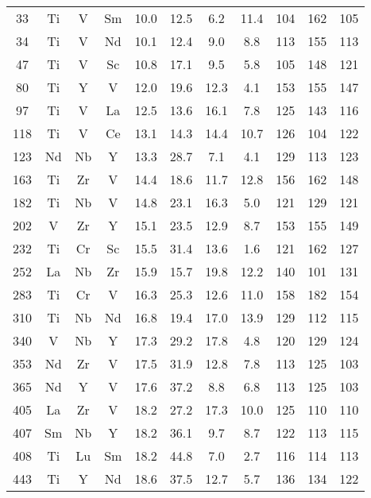 \begin{center}
\begin{xtabular}{c|ccc|cccc|ccc}
  33 &   Ti &    V &   Sm & 10.0 & 12.5 &  6.2 & 11.4 &  104 &  162 &  105 \\
  34 &   Ti &    V &   Nd & 10.1 & 12.4 &  9.0 &  8.8 &  113 &  155 &  113 \\
  47 &   Ti &    V &   Sc & 10.8 & 17.1 &  9.5 &  5.8 &  105 &  148 &  121 \\
  80 &   Ti &    Y &    V & 12.0 & 19.6 & 12.3 &  4.1 &  153 &  155 &  147 \\
  97 &   Ti &    V &   La & 12.5 & 13.6 & 16.1 &  7.8 &  125 &  143 &  116 \\
 118 &   Ti &    V &   Ce & 13.1 & 14.3 & 14.4 & 10.7 &  126 &  104 &  122 \\
 123 &   Nd &   Nb &    Y & 13.3 & 28.7 &  7.1 &  4.1 &  129 &  113 &  123 \\
 163 &   Ti &   Zr &    V & 14.4 & 18.6 & 11.7 & 12.8 &  156 &  162 &  148 \\
 182 &   Ti &   Nb &    V & 14.8 & 23.1 & 16.3 &  5.0 &  121 &  129 &  121 \\
 202 &    V &   Zr &    Y & 15.1 & 23.5 & 12.9 &  8.7 &  153 &  155 &  149 \\
 232 &   Ti &   Cr &   Sc & 15.5 & 31.4 & 13.6 &  1.6 &  121 &  162 &  127 \\
 252 &   La &   Nb &   Zr & 15.9 & 15.7 & 19.8 & 12.2 &  140 &  101 &  131 \\
 283 &   Ti &   Cr &    V & 16.3 & 25.3 & 12.6 & 11.0 &  158 &  182 &  154 \\
 310 &   Ti &   Nb &   Nd & 16.8 & 19.4 & 17.0 & 13.9 &  129 &  112 &  115 \\
 340 &    V &   Nb &    Y & 17.3 & 29.2 & 17.8 &  4.8 &  120 &  129 &  124 \\
 353 &   Nd &   Zr &    V & 17.5 & 31.9 & 12.8 &  7.8 &  113 &  125 &  103 \\
 365 &   Nd &    Y &    V & 17.6 & 37.2 &  8.8 &  6.8 &  113 &  125 &  103 \\
 405 &   La &   Zr &    V & 18.2 & 27.2 & 17.3 & 10.0 &  125 &  110 &  110 \\
 407 &   Sm &   Nb &    Y & 18.2 & 36.1 &  9.7 &  8.7 &  122 &  113 &  115 \\
 408 &   Ti &   Lu &   Sm & 18.2 & 44.8 &  7.0 &  2.7 &  116 &  114 &  113 \\
 443 &   Ti &    Y &   Nd & 18.6 & 37.5 & 12.7 &  5.7 &  136 &  134 &  122 \\

\end{xtabular}
\end{center}

